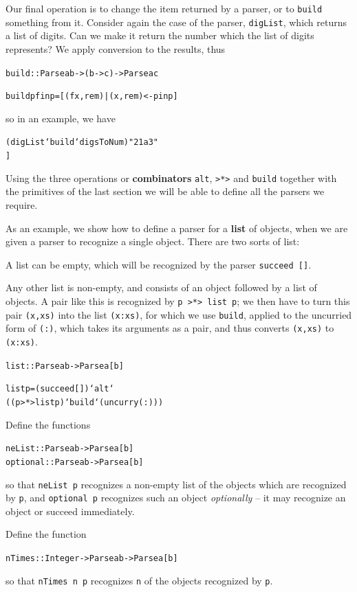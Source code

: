 Our final operation is to change the item returned by a parser, or to 
\texttt{build} something from it. Consider again the case of the parser, \texttt{digList}, which
returns a list of digits. Can we make it return the number which the list of
digits represents? We apply conversion to the results,
thus
\begin{alltt}
build :: Parse a b -> (b -> c) -> Parse a c

build p f inp = [ (f x,rem) | (x,rem) <- p inp ]
\end{alltt}
so in an example, we have
\begin{alltt}
(digList `build` digsToNum) "21a3"
\step [ (digsToNum x,rem) | (x,rem) <- [("2","1a3"),("21","a3")]]
\step [ (2,"1a3") , (21,"a3")]
\end{alltt}
Using the three operations or \textbf{combinators} \texttt{alt}, \texttt{>*>} and
\texttt{build} together with the primitives of the last section we will be able to
define all the parsers we require.

As an example, we show how to define a parser
for a \textbf{list} of objects, when we are given
a parser to recognize a single object. There are two sorts of list:
\begin{titemize}
\item A list can be empty, which will be recognized by the parser 
\texttt{succeed []}.
\item Any other list is non-empty, and consists of an object followed by a
list of objects. A pair like this is recognized by \texttt{p >*> list p}; we
then have to turn this pair \texttt{(x,xs)} into the list \texttt{(x:xs)}, for which
we use \texttt{build}, applied to the uncurried form of \texttt{(:)},
which takes its arguments as a pair, and thus converts \texttt{(x,xs)}
to \texttt{(x:xs)}.
\end{titemize}
\begin{alltt}
list :: Parse a b -> Parse a [b]

list p = (succeed []) `alt`
         ((p >*> list p) `build` (uncurry (:)))
\end{alltt}

\begin{exercises}

\item
Define the functions
\begin{alltt}
neList   :: Parse a b -> Parse a [b]
optional :: Parse a b -> Parse a [b]
\end{alltt}
so that \texttt{neList p} recognizes a non-empty list of the objects
which are
recognized by \texttt{p}, and \texttt{optional p} recognizes such an object
{\em optionally\/} -- it may recognize an object or succeed immediately.

\item
Define the function
\begin{alltt}
nTimes :: Integer -> Parse a b -> Parse a [b]
\end{alltt}
so that \texttt{nTimes n p} recognizes \texttt{n} of the
objects recognized by \texttt{p}.
\end{exercises}

